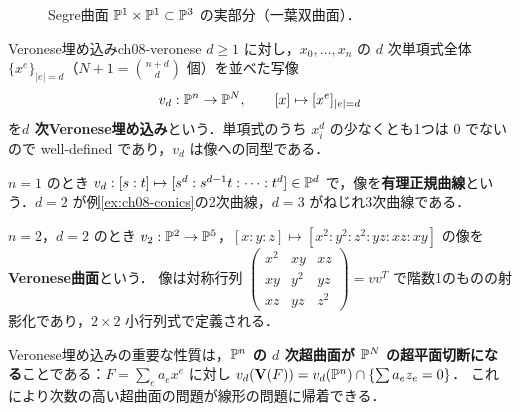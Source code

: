 \begin{figure}[H]
\centering
{}
\caption{Segre曲面 $\mathbb{P}^1\times\mathbb{P}^1\subset\mathbb{P}^3$ の実部分（一葉双曲面）．}
\end{figure}

\begin{myex}{Veronese埋め込み}{ch08-veronese}
$d\ge1$ に対し，$x_0,\dots,x_n$ の $d$ 次単項式全体 $\{x^{e}\}_{|e|=d}$（$N+1=\binom{n+d}{d}$ 個）を並べた写像
\[
  v_d:\mathbb{P}^n\to\mathbb{P}^N,\qquad[x]\mapsto[x^{e}]_{|e|=d}
\]
を\textbf{$d$ 次Veronese埋め込み}という．単項式のうち $x_i^d$ の少なくとも1つは $0$ でないので well-defined であり，$v_d$ は像への同型である．

$n=1$ のとき $v_d:[s:t]\mapsto[s^d:s^{d-1}t:\dots:t^d]\in\mathbb{P}^d$ で，像を\textbf{有理正規曲線}という．$d=2$ が例\ref{ex:ch08-conics}の2次曲線，$d=3$ がねじれ3次曲線である．

$n=2$，$d=2$ のとき $v_2:\mathbb{P}^2\to\mathbb{P}^5$，$[x:y:z]\mapsto[x^2:y^2:z^2:yz:xz:xy]$ の像を\textbf{Veronese曲面}という．
像は対称行列 $\left(\begin{smallmatrix}x^2&xy&xz\\xy&y^2&yz\\xz&yz&z^2\end{smallmatrix}\right)=vv^T$ で階数1のものの射影化であり，$2\times2$ 小行列式で定義される．

Veronese埋め込みの重要な性質は，\textbf{$\mathbb{P}^n$ の $d$ 次超曲面が $\mathbb{P}^N$ の超平面切断になる}ことである：$F=\sum_ea_ex^e$ に対し $v_d(\mathbf{V}(F))=v_d(\mathbb{P}^n)\cap\{\sum a_ez_e=0\}$．
これにより次数の高い超曲面の問題が線形の問題に帰着できる．
\end{myex}

